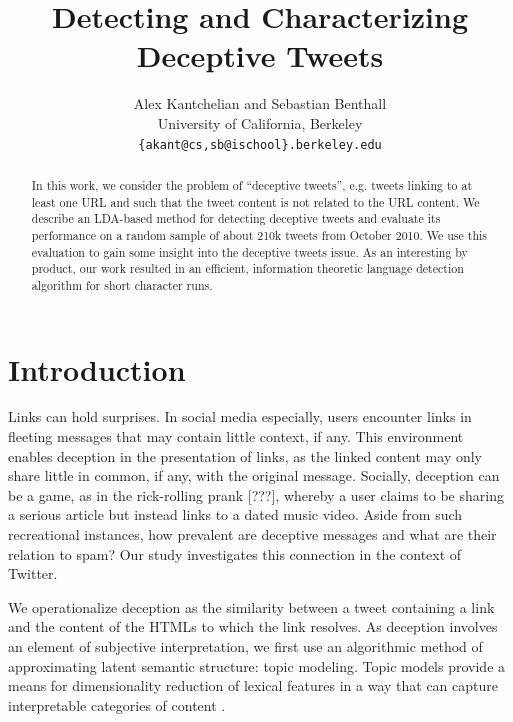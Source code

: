 \documentclass[times, 11pt, twocolumn]{article}
\begin{document}
\title{Detecting and Characterizing Deceptive Tweets}
\author{Alex Kantchelian and Sebastian Benthall \\
University of California, Berkeley \\
 \texttt{\{akant@cs,sb@ischool\}.berkeley.edu}\\
 }
 \date{}

\maketitle

\begin{abstract}
	In this work, we consider the problem of ``deceptive tweets'', e.g. tweets 
	linking to at least one URL and such that the tweet content is not related 
	to the URL content. We describe an LDA-based method for detecting deceptive 
	tweets and evaluate its performance on a random sample of about 210k tweets from 
	October 2010. We use this evaluation to gain some insight into the deceptive 
	tweets issue. As an interesting by product, our work resulted in an efficient, 
	information theoretic language detection algorithm for short character runs.
\end{abstract}

\section{Introduction}

Links can hold surprises. In social media especially, users encounter links in fleeting 
messages that may contain little context, if any. This environment enables deception in 
the presentation of links, as the linked content may only share little in common, if any, 
with the original message. Socially, deception can be a game, as in the rick-rolling prank [???], 
whereby a user claims to be sharing a serious article but instead links to a dated music 
video. Aside from such recreational instances, how prevalent are deceptive messages and 
what are their relation to spam? Our study investigates this connection in the context of Twitter.

We operationalize deception as the similarity between a tweet containing a link 
and the content of the HTMLs to which the link resolves. As deception involves an element 
of subjective interpretation, we first use an algorithmic method of approximating latent 
semantic structure: topic modeling. Topic models provide a means for dimensionality reduction 
of lexical features in a way that can capture interpretable categories of content \cite{Blei2003}.
\end{document}
